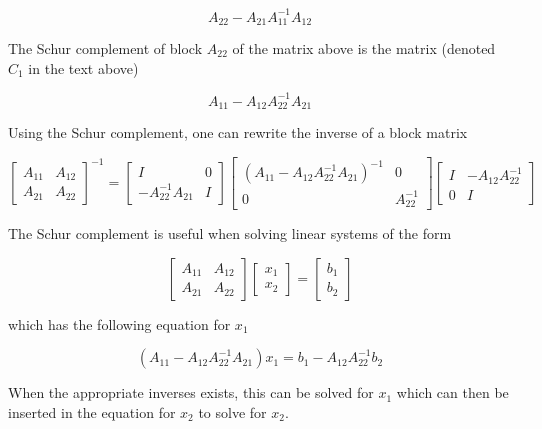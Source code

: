 \[
   A_{22} - A_{21}A_{11}^{-1}A_{12}
\]

The Schur complement of block $A_{22}$ of the matrix above is the matrix (denoted $C_1$ in the text above)

\[
   A_{11} - A_{12}A_{22}^{-1}A_{21}
\]

Using the Schur complement, one can rewrite the inverse of a block matrix

\[
   \left[ \begin{array}{c|c} A_{11} & A_{12} \\ \hline A_{21} & A_{22} \end{array} \right]^{-1}
= \left[ \begin{array}{c|c} I & 0 \\ \hline -A_{22}^{-1}A_{21} & I \end{array} \right] \left[ \begin{array}{c|c} (A_{11} - A_{12}A_{22}^{-1}A_{21})^{-1} & 0 \\ \hline 0 & A_{22}^{-1} \end{array} \right] \left[ \begin{array}{c|c} I & -A_{12}A_{22}^{-1} \\ \hline 0 & I \end{array} \right]
\]

The Schur complement is useful when solving linear systems of the form

\[
   \left[ \begin{array}{c|c} A_{11} & A_{12} \\ \hline A_{21} & A_{22} \end{array} \right] \left[ \begin{array}{c} x_1 \\ x_2 \end{array} \right] = \left[ \begin{array}{c} b_1 \\ b_2 \end{array} \right]
\]

which has the following equation for $x_1$

\[
   (A_{11} - A_{12}A_{22}^{-1}A_{21})x_1 = b_1 - A_{12}A_{22}^{-1}b_2
\]

When the appropriate inverses exists, this can be solved for $x_1$ which can then be inserted in the equation for $x_2$ to solve for $x_2$.

